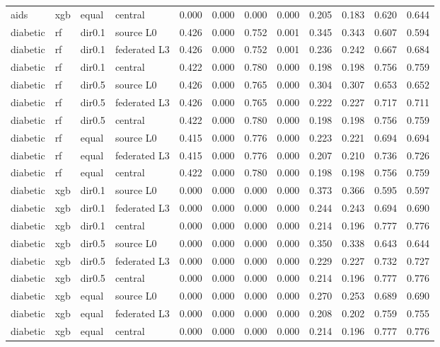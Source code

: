 \begin{tabular}{llllllllllll}
aids & xgb & equal & central & 0.000 & 0.000 & 0.000 & 0.000 & 0.205 & 0.183 & 0.620 & 0.644 \\
\addlinespace
diabetic & rf & dir0.1 & source L0 & 0.426 & 0.000 & 0.752 & 0.001 & 0.345 & 0.343 & 0.607 & 0.594 \\
diabetic & rf & dir0.1 & federated L3 & 0.426 & 0.000 & 0.752 & 0.001 & 0.236 & 0.242 & 0.667 & 0.684 \\
diabetic & rf & dir0.1 & central & 0.422 & 0.000 & 0.780 & 0.000 & 0.198 & 0.198 & 0.756 & 0.759 \\
diabetic & rf & dir0.5 & source L0 & 0.426 & 0.000 & 0.765 & 0.000 & 0.304 & 0.307 & 0.653 & 0.652 \\
diabetic & rf & dir0.5 & federated L3 & 0.426 & 0.000 & 0.765 & 0.000 & 0.222 & 0.227 & 0.717 & 0.711 \\
diabetic & rf & dir0.5 & central & 0.422 & 0.000 & 0.780 & 0.000 & 0.198 & 0.198 & 0.756 & 0.759 \\
diabetic & rf & equal & source L0 & 0.415 & 0.000 & 0.776 & 0.000 & 0.223 & 0.221 & 0.694 & 0.694 \\
diabetic & rf & equal & federated L3 & 0.415 & 0.000 & 0.776 & 0.000 & 0.207 & 0.210 & 0.736 & 0.726 \\
diabetic & rf & equal & central & 0.422 & 0.000 & 0.780 & 0.000 & 0.198 & 0.198 & 0.756 & 0.759 \\
diabetic & xgb & dir0.1 & source L0 & 0.000 & 0.000 & 0.000 & 0.000 & 0.373 & 0.366 & 0.595 & 0.597 \\
diabetic & xgb & dir0.1 & federated L3 & 0.000 & 0.000 & 0.000 & 0.000 & 0.244 & 0.243 & 0.694 & 0.690 \\
diabetic & xgb & dir0.1 & central & 0.000 & 0.000 & 0.000 & 0.000 & 0.214 & 0.196 & 0.777 & 0.776 \\
diabetic & xgb & dir0.5 & source L0 & 0.000 & 0.000 & 0.000 & 0.000 & 0.350 & 0.338 & 0.643 & 0.644 \\
diabetic & xgb & dir0.5 & federated L3 & 0.000 & 0.000 & 0.000 & 0.000 & 0.229 & 0.227 & 0.732 & 0.727 \\
diabetic & xgb & dir0.5 & central & 0.000 & 0.000 & 0.000 & 0.000 & 0.214 & 0.196 & 0.777 & 0.776 \\
diabetic & xgb & equal & source L0 & 0.000 & 0.000 & 0.000 & 0.000 & 0.270 & 0.253 & 0.689 & 0.690 \\
diabetic & xgb & equal & federated L3 & 0.000 & 0.000 & 0.000 & 0.000 & 0.208 & 0.202 & 0.759 & 0.755 \\
diabetic & xgb & equal & central & 0.000 & 0.000 & 0.000 & 0.000 & 0.214 & 0.196 & 0.777 & 0.776 \\

\end{tabular}
